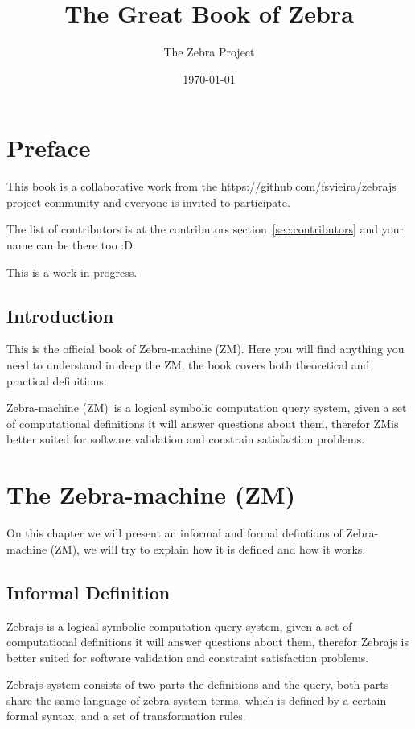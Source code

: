 \documentclass[11pt,a4paper]{report}
\newcommand{\zm}{ZM}
\newcommand{\zsystem}{Zebra-machine (\zm)}
\begin{document}
\title{The Great Book of Zebra}
\author{The Zebra Project}
\date{\today}
\maketitle

\chapter*{Preface}

This book is a collaborative work from the \href{zebrajs}{https://github.com/fsvieira/zebrajs} project community
and everyone is invited to participate.

The list of contributors is at the contributors section~\ref{sec:contributors} and your name can be there too :D.

This is a work in progress.

\tableofcontents

\newpage
\section{Introduction}

This is the official book of \zsystem. Here you will find anything you need to understand in deep the \zm ,
the book covers both theoretical and practical definitions.

\zsystem\ is a logical symbolic computation query system, given a set of computational definitions it will
answer questions about them, therefor \zm is better suited for software validation and constrain satisfaction problems.

\chapter{The \zsystem}

On this chapter we will present an informal and formal defintions of \zsystem, we will try to explain how it is defined and 
how it works.

\section{Informal Definition}

Zebrajs is a logical symbolic computation query system, given a set of computational definitions it will answer questions about them, 
therefor Zebrajs is better suited for software validation and constraint satisfaction problems.

Zebrajs system consists of two parts the definitions and the query, both parts share the same language of zebra-system terms, 
which is defined by a certain formal syntax, and a set of transformation rules.
\end{document}
